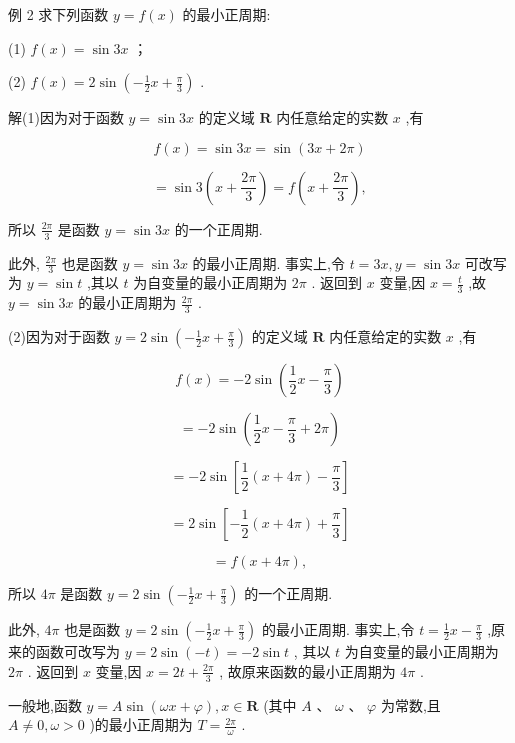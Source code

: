 \documentclass[10pt]{article}
\begin{document}
例 2 求下列函数 \(y = f\left( x\right)\) 的最小正周期:

(1) \(f\left( x\right)  = \sin {3x}\) ；

(2) \(f\left( x\right)  = 2\sin \left( {-\frac{1}{2}x + \frac{\pi }{3}}\right)\) .

解(1)因为对于函数 \(y = \sin {3x}\) 的定义域 \(\mathbf{R}\) 内任意给定的实数 \(x\) ,有

\[
f\left( x\right)  = \sin {3x} = \sin \left( {{3x} + {2\pi }}\right)
\]

\[
= \sin 3\left( {x + \frac{2\pi }{3}}\right)  = f\left( {x + \frac{2\pi }{3}}\right) ,
\]

所以 \(\frac{2\pi }{3}\) 是函数 \(y = \sin {3x}\) 的一个正周期.

此外, \(\frac{2\pi }{3}\) 也是函数 \(y = \sin {3x}\) 的最小正周期. 事实上,令 \(t = {3x},y = \sin {3x}\) 可改写为 \(y = \sin t\) ,其以 \(t\) 为自变量的最小正周期为 \({2\pi }\) . 返回到 \(x\) 变量,因 \(x = \frac{t}{3}\) ,故 \(y = \sin {3x}\) 的最小正周期为 \(\frac{2\pi }{3}\) .

(2)因为对于函数 \(y = 2\sin \left( {-\frac{1}{2}x + \frac{\pi }{3}}\right)\) 的定义域 \(\mathbf{R}\) 内任意给定的实数 \(x\) ,有

\[
f\left( x\right)  =  - 2\sin \left( {\frac{1}{2}x - \frac{\pi }{3}}\right)
\]

\[
=  - 2\sin \left( {\frac{1}{2}x - \frac{\pi }{3} + {2\pi }}\right)
\]

\[
=  - 2\sin \left\lbrack  {\frac{1}{2}\left( {x + {4\pi }}\right)  - \frac{\pi }{3}}\right\rbrack
\]

\[
= 2\sin \left\lbrack  {-\frac{1}{2}\left( {x + {4\pi }}\right)  + \frac{\pi }{3}}\right\rbrack
\]

\[
= f\left( {x + {4\pi }}\right) ,
\]

所以 \({4\pi }\) 是函数 \(y = 2\sin \left( {-\frac{1}{2}x + \frac{\pi }{3}}\right)\) 的一个正周期.

此外, \({4\pi }\) 也是函数 \(y = 2\sin \left( {-\frac{1}{2}x + \frac{\pi }{3}}\right)\) 的最小正周期. 事实上,令 \(t = \frac{1}{2}x - \frac{\pi }{3}\) ,原来的函数可改写为 \(y = 2\sin \left( {-t}\right)  =  - 2\sin t\) , 其以 \(t\) 为自变量的最小正周期为 \({2\pi }\) . 返回到 \(x\) 变量,因 \(x = {2t} + \frac{2\pi }{3}\) , 故原来函数的最小正周期为 \({4\pi }\) .

一般地,函数 \(y = A\sin \left( {{\omega x} + \varphi }\right) ,x \in  \mathbf{R}\) (其中 \(A\text{ 、 }\omega \text{ 、 }\varphi\) 为常数,且 \(A \neq  0,\omega  > 0\) )的最小正周期为 \(T = \frac{2\pi }{\omega }\) .
\end{document}
